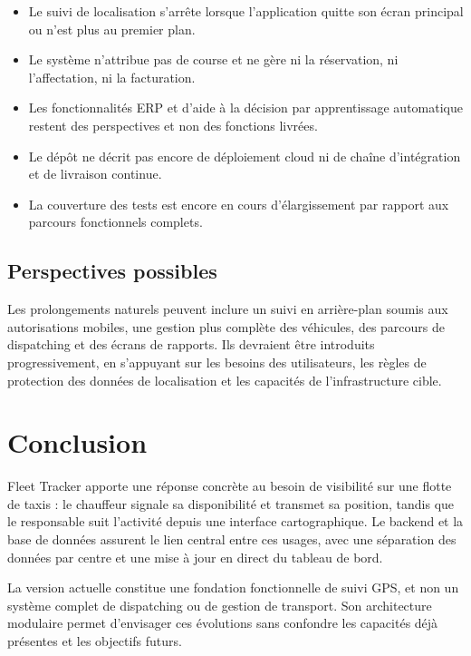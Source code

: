 \documentclass[11pt,a4paper,oneside]{report}
\begin{document}
\begin{itemize}
  \item Le suivi de localisation s'arrête lorsque l'application quitte son
        écran principal ou n'est plus au premier plan.
  \item Le système n'attribue pas de course et ne gère ni la réservation, ni
        l'affectation, ni la facturation.
  \item Les fonctionnalités ERP et d'aide à la décision par apprentissage
        automatique restent des perspectives et non des fonctions livrées.
  \item Le dépôt ne décrit pas encore de déploiement cloud ni de chaîne
        d'intégration et de livraison continue.
  \item La couverture des tests est encore en cours d'élargissement par rapport
        aux parcours fonctionnels complets.
\end{itemize}

\section{Perspectives possibles}

Les prolongements naturels peuvent inclure un suivi en arrière-plan soumis aux
autorisations mobiles, une gestion plus complète des véhicules, des parcours
de dispatching et des écrans de rapports. Ils devraient être introduits
progressivement, en s'appuyant sur les besoins des utilisateurs, les règles de
protection des données de localisation et les capacités de l'infrastructure
cible.

\chapter{Conclusion}

Fleet Tracker apporte une réponse concrète au besoin de visibilité sur une
flotte de taxis : le chauffeur signale sa disponibilité et transmet sa
position, tandis que le responsable suit l'activité depuis une interface
cartographique. Le backend et la base de données assurent le lien central entre
ces usages, avec une séparation des données par centre et une mise à jour en
direct du tableau de bord.

La version actuelle constitue une fondation fonctionnelle de suivi GPS, et
non un système complet de dispatching ou de gestion de transport. Son
architecture modulaire permet d'envisager ces évolutions sans confondre les
capacités déjà présentes et les objectifs futurs.
\end{document}
